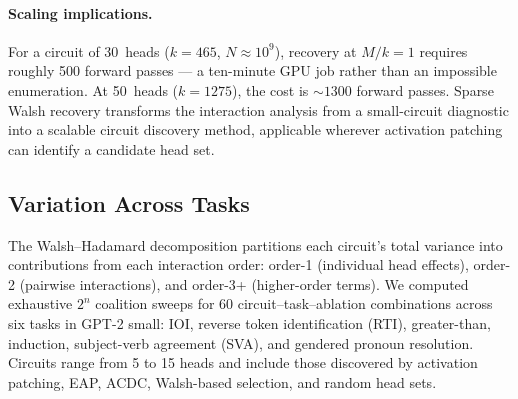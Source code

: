\documentclass{article}
\begin{document}
\paragraph{Scaling implications.}

For a circuit of 30~heads ($k = 465$, $N \approx 10^9$), recovery at
$M/k = 1$ requires roughly 500 forward passes --- a ten-minute GPU job
rather than an impossible enumeration. At 50~heads ($k = 1275$), the
cost is ${\sim}1300$ forward passes. Sparse Walsh recovery transforms
the interaction analysis from a small-circuit diagnostic into a scalable
circuit discovery method, applicable wherever activation patching can
identify a candidate head set.


%
%

\subsection{Variation Across Tasks}
\label{sec:energy-spectrum}

The Walsh--Hadamard decomposition partitions each circuit's total
variance into contributions from each interaction order: order-1
(individual head effects), order-2 (pairwise interactions), and
order-3+ (higher-order terms). We computed exhaustive $2^n$ coalition
sweeps for 60 circuit--task--ablation combinations across six tasks in
GPT-2 small: IOI, reverse token identification (RTI), greater-than,
induction, subject-verb agreement (SVA), and gendered pronoun
resolution. Circuits range from 5 to 15 heads and include those
discovered by activation patching, EAP, ACDC, Walsh-based selection,
and random head sets.

\medskip
\end{document}
